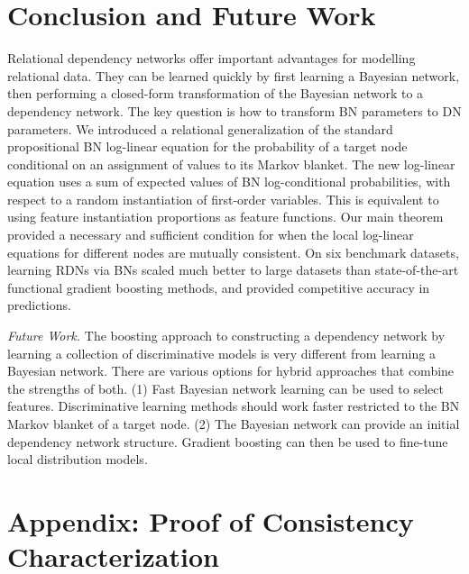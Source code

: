 \documentclass[runningheads,a4paper]{llncs}
\begin{document}
\section{Conclusion and Future Work} 
\label{sec:conclusion}
Relational dependency networks offer important advantages for modelling relational data. They can be learned quickly by first learning a Bayesian network, then performing a closed-form transformation of the Bayesian network to a dependency network. The key question is how to transform BN parameters to DN parameters. We introduced a relational generalization of the standard propositional BN log-linear equation for the probability of a target node conditional on an assignment of values to its Markov blanket. The new log-linear equation uses a sum of expected values of BN log-conditional probabilities, with respect to a random instantiation of first-order variables. This is equivalent to using feature instantiation proportions as feature functions.  Our main theorem provided a necessary and sufficient condition for when the local log-linear equations for different nodes are mutually consistent. On six benchmark datasets, learning RDNs via BNs scaled much better to large datasets than state-of-the-art functional gradient boosting methods, and provided competitive accuracy in predictions.

{\em Future Work.}
The boosting approach to constructing a dependency network by learning a collection of discriminative models is very different from learning a Bayesian network. There are various options for hybrid approaches that combine the strengths of both. (1) Fast Bayesian network learning can be used to select features. Discriminative learning methods should work faster restricted to the BN Markov blanket of a target node. (2) The Bayesian network can provide an initial dependency network structure. Gradient boosting can then be used to fine-tune local distribution models.



\section*{Appendix: Proof of Consistency Characterization} 
\end{document}
